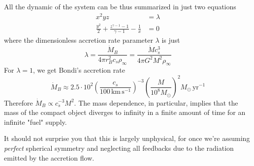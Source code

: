 All the dynamic of the system can be thus summarized in just two equations
\begin{align*}
    x^{2}yz &= \lambda \\
    \frac{y^{2}}{2} + \frac{z^{\gamma-1}-1}{\gamma -1}-\frac{1}{x} &= 0
\end{align*}
where the dimensionless accretion rate parameter $\lambda$ is just
\begin{equation*}
    \lambda = \frac{\dot{M}_{B}}{4\pi r^{2}_{B}c_{s}\rho_{\infty}} = \frac{\dot{M}c^{3}_{s}}{4\pi G^{2}M^{2}\rho_{\infty}}
\end{equation*}
For $\lambda = 1$, we get Bondi's accretion rate
\begin{equation*}
    \dot{M}_{B} \approx 2.5\cdot 10^{2}\left(\frac{c_{s}}{100\,\text{km}\,\text{s}^{-1}}\right)^{-3}\left(\frac{M}{10^{8}M_{\odot}}\right)^{2}M_{\odot}\,\text{yr}^{-1}
\end{equation*}
Therefore $\dot{M}_{B}\propto c^{-3}_{s}M^{2}$. The mass dependence, in particular, implies that the mass of the compact object diverges to infinity in a finite amount of time for an infinite "fuel" supply. \par It should not surprise you that this is largely unphysical, for once we're assuming \emph{perfect} spherical symmetry and neglecting all feedbacks due to the radiation emitted by the accretion flow.
